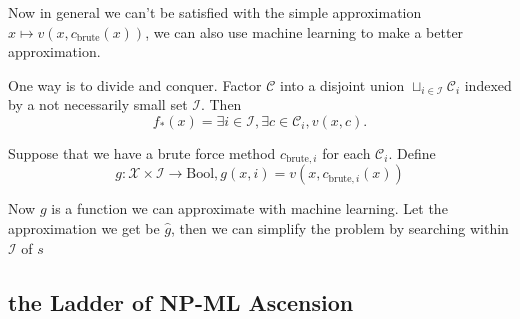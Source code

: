 \documentclass[11pt, oneside]{article}   	%
\theoremstyle{definition}
\begin{document}
Now in general we can't be satisfied with the simple approximation $x\mapsto v(x,c_{\text{brute}}(x))$, we can also use machine learning to make a better approximation.

One way is to divide and conquer. Factor $\mathcal{C}$ into a disjoint union $\sqcup_{i\in \mathcal{I}} \mathcal{C}_{i}$ indexed by a not necessarily small set $\mathcal{I}$. Then
\begin{equation}
	f_*(x)=\exists i\in \mathcal{I}, \exists c\in \mathcal{C}_i, v(x,c).
\end{equation}

Suppose that we have a brute force method $c_{\text{brute},i}$ for each $\mathcal{C}_i$. Define
\begin{equation}
	g: \mathcal{X}\times \mathcal{I} \rightarrow \text{Bool}, g(x, i) = v(x, c_{\text{brute},i}(x))
\end{equation}

Now $g$ is a function we can approximate with machine learning. Let the approximation we get be $\hat{g}$, then we can simplify the problem by searching within $\mathcal{I}$ of $s$

\subsection{the Ladder of NP-ML Ascension}
\begin{center}
\end{center}
\end{document}
